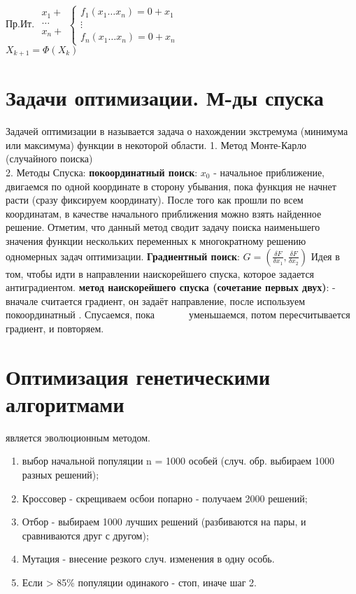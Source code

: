 \documentclass{article}
\begin{document}
Пр.Ит.
\begin{math}
\begin{array}{l}
  x_1 + \\
  \ldots \\
  x_n + \\
\end{array}
\left\{
\begin{array}{l}
  f_1(x_1 \ldots x_n) = 0 + x_1\\
  \vdots \\
  f_n(x_1 \ldots x_n) = 0 + x_n
\end{array}
\end{math}\\

$X_{k+1} = \Phi(X_k)$

\section{Задачи оптимизации. М-ды спуска}
Задачей оптимизации в называется задача о нахождении экстремума (минимума или
максимума) функции в некоторой области.
1. Метод Монте-Карло (случайного поиска)\\
2. Методы Спуска: \textbf{покоординатный поиск}: $x_0$ - начальное приближение,
двигаемся по одной координате в сторону убывания, пока функция не начнет расти (сразу
фиксируем координату). После того как прошли по всем координатам, в качестве
начального приближения можно взять найденное решение. Отметим, что данный метод
сводит задачу поиска наименьшего значения функции нескольких переменных к
многократному решению одномерных задач оптимизации. \textbf{Градиентный поиск}:
$G= (\frac{\delta F}{\delta x_1}, \frac{\delta F}{\delta x_2})$ Идея в том,
чтобы идти в направлении наискорейшего спуска, которое задается антиградиентом.
\textbf{метод наискорейшего спуска (сочетание первых двух)}:  - вначале считается градиент,
он задаёт направление, после используем покоординатный . Спусаемся, пока       
уменьшаемся, потом пересчитывается градиент, и повторяем.

\section{Оптимизация генетическими алгоритмами}
является эволюционным методом. 
\begin{enumerate}
  \item выбор начальной популяции n = 1000 особей (случ. обр. выбираем 1000
  разных решений);
  \item Кроссовер - скрещиваем осбои попарно - получаем 2000 решений;
  \item Отбор - выбираем 1000 лучших решений (разбиваются на пары, и
  сравниваются друг с другом);
  \item Мутация - внесение резкого случ. изменения в одну особь.
  \item Если > 85\% популяции одинакого - стоп, иначе шаг 2.
\end{enumerate}
\end{document}
